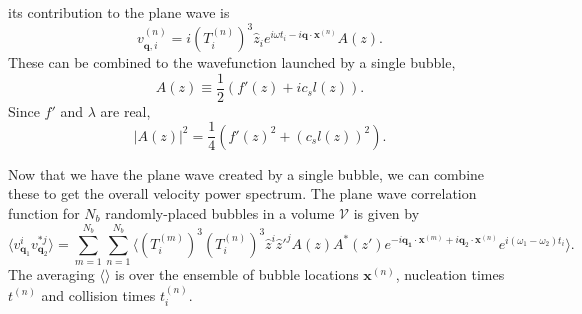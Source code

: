 its contribution to the plane wave is
\cite[eq. 4.9]{hindmarsh_gw_pt_2019}
\begin{equation}
v_{\mathbf{q},i}^{(n)} = i (T_i^{(n)})^3 \hat{z}_i e^{i \omega t_i - i \mathbf{q} \cdot \mathbf{x}^{(n)}} A(z).
\end{equation}
These can be combined to the wavefunction launched by a single bubble,
\cite[eq. 4.10]{hindmarsh_gw_pt_2019}
\begin{equation}
A(z) \equiv \frac{1}{2} \left( f'(z) + i c_s l(z) \right).
\end{equation}
Since $f'$ and $\lambda$ are real,
\cite[eq. 4.11]{hindmarsh_gw_pt_2019}
\begin{equation}
|A(z)|^2 = \frac{1}{4} \left( f'(z)^2 + (c_s l(z))^2 \right).
\end{equation}

Now that we have the plane wave created by a single bubble,
we can combine these to get the overall velocity power spectrum.
The plane wave correlation function for $N_b$ randomly-placed bubbles in a volume $\mathcal{V}$ is given by
\cite[eq. 4.12]{hindmarsh_gw_pt_2019}
\begin{equation}
\langle v_{\mathbf{q}_1}^i v_{\mathbf{q}_2}^{*j} \rangle
= \sum_{m=1}^{N_b} \sum_{n=1}^{N_b} \langle
(T_i^{(m)})^3 (T_i^{(n)})^3 \hat{z}^i \hat{z}'^{j} A(z) A^*(z')
e^{-i \mathbf{q_1} \cdot \mathbf{x}^{(m)} + i \mathbf{q}_2 \cdot \mathbf{x}^{(n)}}
e^{i (\omega_1 - \omega_2) t_i}
\rangle.
\end{equation}
The averaging $\langle \rangle$ is over the ensemble of bubble locations $\mathbf{x}^{(n)}$, nucleation times $t^{(n)}$ and collision times $t_i^{(n)}$.


